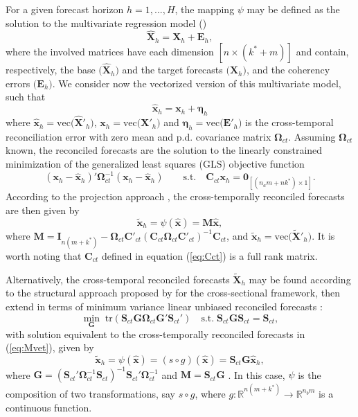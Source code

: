 \documentclass[a4paper,11pt]{article}
\newcommand{\etavet}{\bm{\eta}}
\newcommand{\xvet}{\bm{x}}
\newcommand{\Cvet}{\bm{C}}
\newcommand{\Evet}{\bm{E}}
\newcommand{\Gvet}{\bm{G}}
\newcommand{\Ivet}{\bm{I}}
\newcommand{\Mvet}{\bm{M}}
\newcommand{\Svet}{\bm{S}}
\newcommand{\Xvet}{\bm{X}}
\newcommand{\Zerovet}{\bm{0}}
\newcommand{\Omegavet}{\bm{\Omega}}
\theoremstyle{definition}
\begin{document}
For a given forecast horizon $h = 1,..., H$, the mapping $\psi$ may be defined as the solution to the multivariate regression model (\citealp{difonzo2023})
$$
\widehat{\Xvet}_{h} = \Xvet_{h} + \Evet_{h},
$$ 
where the involved matrices have each dimension $[n \times (k^\ast + m)]$ and contain, respectively, the base $\Big(\widehat{\Xvet}_{h}\Big)$ and the target forecasts $\Big(\Xvet_{h}\Big)$, and the coherency errors $\Big(\Evet_{h}\Big)$. We consider now the vectorized version of this multivariate model, such that
$$
\widehat{\xvet}_{h} = \xvet_{h} + \etavet_{h}
$$
where $\widehat{\xvet}_{h} = \mathrm{vec}\Big(\widehat{\Xvet}'_{h}\Big)$, $\xvet_{h} = \mathrm{vec}\Big(\Xvet'_{h}\Big)$ and $\etavet_{h} = \mathrm{vec}\Big(\Evet'_{h}\Big)$  is the cross-temporal reconciliation error with zero mean and p.d. covariance matrix $\Omegavet_{ct}$.
Assuming $\Omegavet_{ct}$ known, the reconciled forecasts are the solution to the linearly constrained minimization of the generalized least squares (GLS) objective function
$$
\left(\xvet_h - \widehat{\xvet}_h\right)' \Omegavet_{ct}^{-1}\left(\xvet_h - \widehat{\xvet}_h\right)  \qquad \text{s.t.} \quad \Cvet_{ct}\xvet_h = \Zerovet_{[(n_am+nk^\ast)\times1]}.
$$
According to the projection approach \citep{byron1978,byron1979, vanerven2015, wickramasuriya2019, panagiotelis2021, difonzo2023}, the cross-temporally reconciled forecasts are then given by 
\begin{equation}
	\label{eq:Mvet}
	\widetilde{\xvet}_{h} = \psi\left(\widehat{\xvet}\right) = \Mvet \widehat{\xvet},
\end{equation}
where $\Mvet = \Ivet_{n(m+ k^\ast)} - \Omegavet_{ct}\Cvet'_{ct}\left(\Cvet_{ct}\Omegavet_{ct}\Cvet'_{ct}\right)^{-1}\Cvet_{ct}$, and $\widetilde{\xvet}_{h} = \mathrm{vec}\Big(\widetilde{\Xvet}'_{h}\Big)$. It is worth noting that $\Cvet_{ct}$ defined in equation (\ref{eq:Cct}) is a full rank matrix.

Alternatively, the cross-temporal reconciled forecasts $\widetilde{\Xvet}_{h}$ may be found according to the structural approach proposed by \cite{hyndman2011} for the cross-sectional framework, then extend in terms of minimum variance linear unbiased reconciled forecasts \citep{wickramasuriya2019}:
$$
\min_{\Gvet} \; \text{tr}\left(\Svet_{ct}\Gvet\Omegavet_{ct}\Gvet'\Svet_{ct}' \right) \quad \text{s.t.} \; \Svet_{ct}\Gvet\Svet_{ct} = \Svet_{ct},
$$
with solution equivalent to the cross-temporally reconciled forecasts in (\ref{eq:Mvet}), given by
\begin{equation}\label{eq:SGy}
	\widetilde{\xvet}_{h} = \psi\left(\widehat{\xvet}\right) = \left(s \circ g \right)\left(\widehat{\xvet}\right)=\Svet_{ct}\Gvet \widehat{\xvet}_{h},
\end{equation}
where $\Gvet = \left(\Svet_{ct}' \Omegavet_{ct}^{-1}\Svet_{ct}\right)^{-1} \Svet_{ct}'\Omegavet_{ct}^{-1}$ and $\Mvet = \Svet_{ct} \Gvet$ \citep{wickramasuriya2019, difonzo2023}. In this case, $\psi$ is the composition of two transformations, say $s \circ g$, where $g: \mathbb{R}^{n(m+k^\ast)} \rightarrow \mathbb{R}^{n_b m}$ is a continuous function. 
\end{document}
